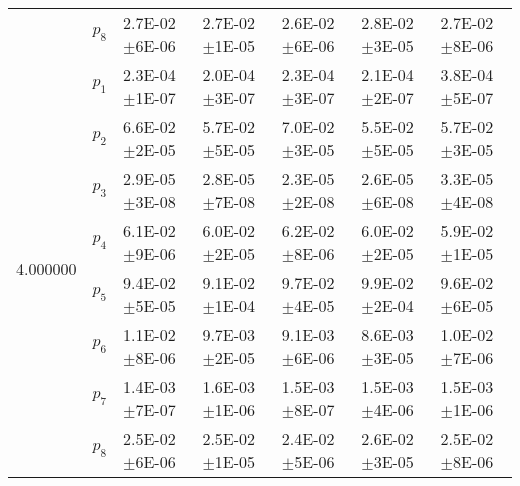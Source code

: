 \begin{tabular}{lllllll}
 & $p_8$ & 2.7E-02\(\pm\)6E-06 & 2.7E-02\(\pm\)1E-05 & 2.6E-02\(\pm\)6E-06 & 2.8E-02\(\pm\)3E-05 & 2.7E-02\(\pm\)8E-06 \\
\multirow[c]{8}{*}{4.000000} & $p_1$ & 2.3E-04\(\pm\)1E-07 & 2.0E-04\(\pm\)3E-07 & 2.3E-04\(\pm\)3E-07 & 2.1E-04\(\pm\)2E-07 & 3.8E-04\(\pm\)5E-07 \\
 & $p_2$ & 6.6E-02\(\pm\)2E-05 & 5.7E-02\(\pm\)5E-05 & 7.0E-02\(\pm\)3E-05 & 5.5E-02\(\pm\)5E-05 & 5.7E-02\(\pm\)3E-05 \\
 & $p_3$ & 2.9E-05\(\pm\)3E-08 & 2.8E-05\(\pm\)7E-08 & 2.3E-05\(\pm\)2E-08 & 2.6E-05\(\pm\)6E-08 & 3.3E-05\(\pm\)4E-08 \\
 & $p_4$ & 6.1E-02\(\pm\)9E-06 & 6.0E-02\(\pm\)2E-05 & 6.2E-02\(\pm\)8E-06 & 6.0E-02\(\pm\)2E-05 & 5.9E-02\(\pm\)1E-05 \\
 & $p_5$ & 9.4E-02\(\pm\)5E-05 & 9.1E-02\(\pm\)1E-04 & 9.7E-02\(\pm\)4E-05 & 9.9E-02\(\pm\)2E-04 & 9.6E-02\(\pm\)6E-05 \\
 & $p_6$ & 1.1E-02\(\pm\)8E-06 & 9.7E-03\(\pm\)2E-05 & 9.1E-03\(\pm\)6E-06 & 8.6E-03\(\pm\)3E-05 & 1.0E-02\(\pm\)7E-06 \\
 & $p_7$ & 1.4E-03\(\pm\)7E-07 & 1.6E-03\(\pm\)1E-06 & 1.5E-03\(\pm\)8E-07 & 1.5E-03\(\pm\)4E-06 & 1.5E-03\(\pm\)1E-06 \\
 & $p_8$ & 2.5E-02\(\pm\)6E-06 & 2.5E-02\(\pm\)1E-05 & 2.4E-02\(\pm\)5E-06 & 2.6E-02\(\pm\)3E-05 & 2.5E-02\(\pm\)8E-06 \\
\end{tabular}
